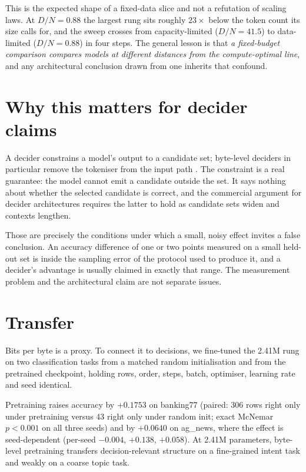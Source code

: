 \documentclass[11pt]{article}
\begin{document}
This is the expected shape of a fixed-data slice and not a refutation of scaling
laws. At $D/N = 0.88$ the largest rung sits roughly $23\times$ below the token
count its size calls for, and the sweep crosses from capacity-limited
($D/N = 41.5$) to data-limited ($D/N = 0.88$) in four steps. The general lesson is
that \emph{a fixed-budget comparison compares models at different distances from
the compute-optimal line}, and any architectural conclusion drawn from one inherits
that confound.

\section{Why this matters for decider claims}

A decider constrains a model's output to a candidate set; byte-level deciders in
particular remove the tokeniser from the input path \citep{xue2022byt5}. The constraint is a real
guarantee: the model cannot emit a candidate outside the set. It says nothing about
whether the selected candidate is correct, and the commercial argument for decider
architectures requires the latter to hold as candidate sets widen and contexts
lengthen.

Those are precisely the conditions under which a small, noisy effect invites a
false conclusion. An accuracy difference of one or two points measured on a small
held-out set is inside the sampling error of the protocol used to produce it, and a
decider's advantage is usually claimed in exactly that range. The measurement
problem and the architectural claim are not separate issues.

\section{Transfer}

Bits per byte is a proxy. To connect it to decisions, we fine-tuned the 2.41M rung
on two classification tasks from a matched random initialisation and from the
pretrained checkpoint, holding rows, order, steps, batch, optimiser, learning rate
and seed identical.



Pretraining raises accuracy by $+0.1753$ on banking77 (paired: 306 rows right only
under pretraining versus 43 right only under random init; exact McNemar $p<0.001$
on all three seeds) and by $+0.0640$ on ag\_news, where the effect is seed-dependent
(per-seed $-0.004$, $+0.138$, $+0.058$). At 2.41M parameters, byte-level
pretraining transfers decision-relevant structure on a fine-grained intent task and
weakly on a coarse topic task.
\end{document}
